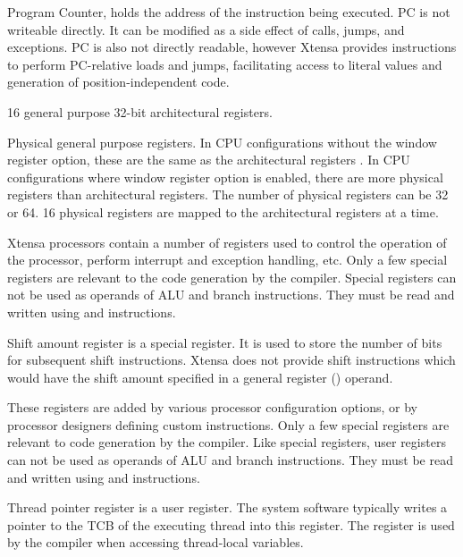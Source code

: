 \begin{description}[leftmargin=10em,style=nextline]
  \item[\reg{PC}] Program Counter, holds the address of the instruction being executed. PC is not writeable directly. It can be modified as a side effect of calls, jumps, and exceptions. PC is also not directly readable, however Xtensa provides instructions to perform PC-relative loads and jumps, facilitating access to literal values and generation of position-independent code. 
  \item[\reg{\an}] 16 general purpose 32-bit architectural registers.
  \item[\reg{AR[n]}] Physical general purpose registers. In CPU configurations without the window register option, these are the same as the architectural registers \reg{\an}. In CPU configurations where window register option is enabled, there are more  physical registers than architectural registers. The number of physical registers can be 32 or 64. 16 physical registers are mapped to the architectural registers \reg{\an} at a time.
  \item[Special registers] Xtensa processors contain a number of registers used to control the operation of the processor, perform interrupt and exception handling, etc. Only a few special registers are relevant to the code generation by the compiler. Special registers can not be used as operands of ALU and branch instructions. They must be read and written using  and  instructions.
  \item[\reg{SAR}] Shift amount register is a special register. It is used to store the number of bits for subsequent shift instructions. Xtensa does not provide shift instructions which would have the shift amount specified in a general register (\reg{\an}) operand.
  \item[User registers] These registers are added by various processor configuration options, or by processor designers defining custom instructions. Only a few special registers are relevant to code generation by the compiler. Like special registers, user registers can not be used as operands of ALU and branch instructions. They must be read and written using  and  instructions.
  \item[\reg{THREADPTR}] Thread pointer register is a user register. The system software typically writes a pointer to the TCB of the executing thread into this register. The register is used by the compiler when accessing thread-local variables.
\end{description}

